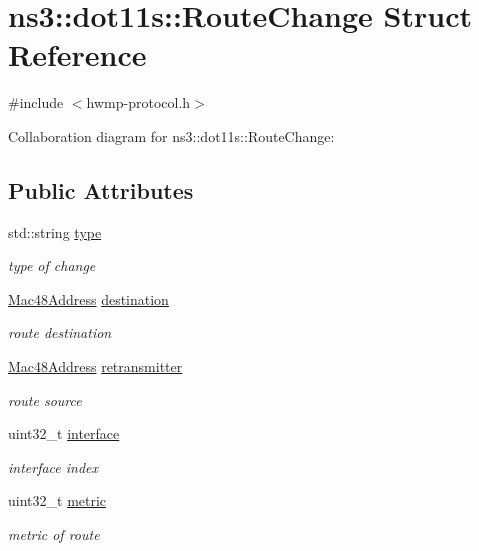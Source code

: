 \hypertarget{structns3_1_1dot11s_1_1RouteChange}{}\section{ns3\+:\+:dot11s\+:\+:Route\+Change Struct Reference}
\label{structns3_1_1dot11s_1_1RouteChange}


{\ttfamily \#include $<$hwmp-\/protocol.\+h$>$}



Collaboration diagram for ns3\+:\+:dot11s\+:\+:Route\+Change\+:
\subsection*{Public Attributes}
\begin{DoxyCompactItemize}
\item 
std\+::string \hyperlink{structns3_1_1dot11s_1_1RouteChange_acff05b54ffee794ebee006159bea20dc}{type}
\begin{DoxyCompactList}\small\item\em type of change \end{DoxyCompactList}\item 
\hyperlink{classns3_1_1Mac48Address}{Mac48\+Address} \hyperlink{structns3_1_1dot11s_1_1RouteChange_aa7b4a08b0b376dc5ca8577f11971d7b3}{destination}
\begin{DoxyCompactList}\small\item\em route destination \end{DoxyCompactList}\item 
\hyperlink{classns3_1_1Mac48Address}{Mac48\+Address} \hyperlink{structns3_1_1dot11s_1_1RouteChange_a23ef9fccd945f9c91c0cf9c21133a71c}{retransmitter}
\begin{DoxyCompactList}\small\item\em route source \end{DoxyCompactList}\item 
uint32\+\_\+t \hyperlink{structns3_1_1dot11s_1_1RouteChange_ad4f435c0de351fb32d03abf6416975ae}{interface}
\begin{DoxyCompactList}\small\item\em interface index \end{DoxyCompactList}\item 
uint32\+\_\+t \hyperlink{structns3_1_1dot11s_1_1RouteChange_a9be2c3c4e622c4dbee4d0c0f4342c550}{metric}
\begin{DoxyCompactList}\small\item\em metric of route \end{DoxyCompactList}\item 

\end{DoxyCompactItemize}
